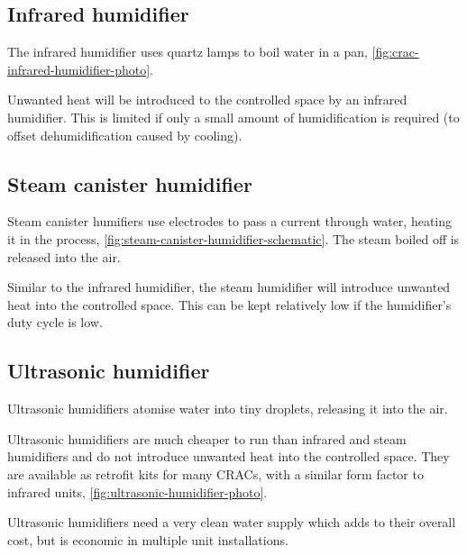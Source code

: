 \documentclass{pgnotes}
\begin{document}
\subsection{Infrared humidifier}
\label{sec:infrared-humidifier}

The infrared humidifier uses quartz lamps to boil water in a pan, \autoref{fig:crac-infrared-humidifier-photo}.


Unwanted heat will be introduced to the controlled space by an infrared humidifier.
This is limited if only a small amount of humidification is required (to offset dehumidification caused by cooling).

\subsection{Steam canister humidifier}
\label{sec:steam-canister-humidifier}

Steam canister humifiers use electrodes to pass a current through water, heating it in the process, \autoref{fig:steam-canister-humidifier-schematic}.
The steam boiled off is released into the air.


Similar to the infrared humidifier, the steam humidifier will introduce unwanted heat into the controlled space.
This can be kept relatively low if the humidifier's duty cycle is low. 

\subsection{Ultrasonic humidifier}
\label{sec:ultrasonic-humidifier}

Ultrasonic humidifiers atomise water into tiny droplets, releasing it into the air.

Ultrasonic humidifiers are much cheaper to run than infrared and steam humidifiers and do not introduce unwanted heat into the controlled space.
They are available as retrofit kits for many CRACs, with a similar form factor to infrared units, \autoref{fig:ultrasonic-humidifier-photo}.


Ultrasonic humidifiers need a very clean water supply which adds to their overall cost, but is economic in multiple unit installations. 
\end{document}
